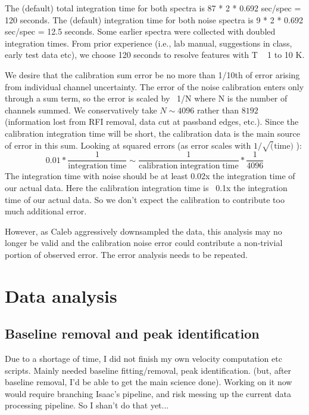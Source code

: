 \documentclass[10pt]{article}
\newcommand {\mt}{\mathrm}
\begin{document}
The (default) total integration time for both spectra is 87 * 2 * 0.692 sec/spec = 120 seconds.  The (default) integration time for both noise spectra is 9 * 2 * 0.692 sec/spec = 12.5 seconds.  Some earlier spectra were collected with doubled integration times.  From prior experience (i.e., lab manual, suggestions in class, early test data etc), we choose 120 seconds to resolve features with T ~ 1 to 10 K.

We desire that the calibration sum error be no more than 1/10th of error arising from individual channel uncertainty.  The error of the noise calibration enters only through a sum term, so the error is scaled by ~1/N where N is the number of channels summed.  We conservatively take $N \sim 4096$ rather than $8192$ (information lost from RFI removal, data cut at passband edges, etc.).  Since the calibration integration time will be short, the calibration data is the main source of error in this sum.  Looking at squared errors (as error scales with $1 / \sqrt(\mt{time})$ ):
\[
    0.01 * \frac{1}{\mt{integration\;time}} \sim \frac{1}{\mt{calibration\;integration\;time}} * \frac{1}{4096}
\]
The integration time with noise should be at least 0.02x the integration time of our actual data.  Here the calibration integration time is ~0.1x the integration time of our actual data.  So we don't expect the calibration to contribute too much additional error.

However, as Caleb aggressively downsampled the data, this analysis may no longer be valid and the calibration noise error could contribute a non-trivial portion of observed error.  The error analysis needs to be repeated.

\section{Data analysis}

\subsection{Baseline removal and peak identification}

Due to a shortage of time, I did not finish my own
velocity computation etc scripts.  Mainly needed baseline fitting/removal, peak identification.  (but, after baseline removal, I'd be able to get the main science done).  Working on it now would require branching Isaac's pipeline, and risk messing up the current data processing pipeline.  So I shan't do that yet...
\end{document}
